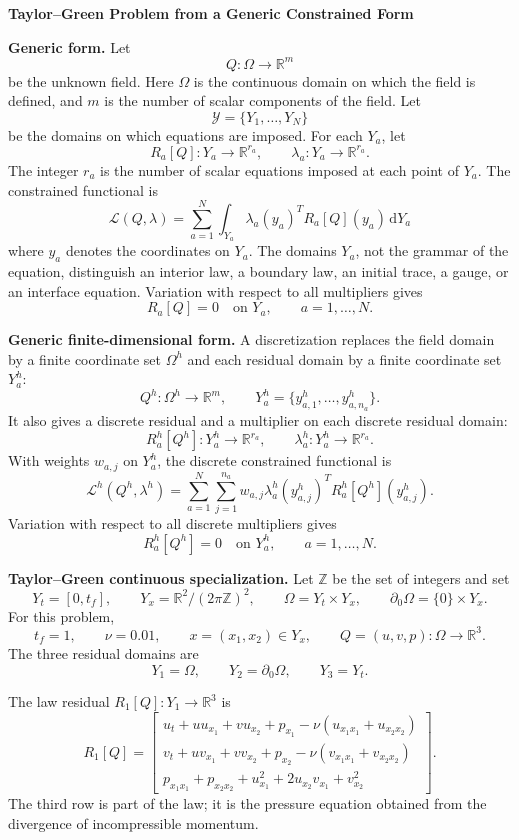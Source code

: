 \documentclass[10pt]{article}
\newcommand{\R}{\mathbb R}
\newcommand{\Z}{\mathbb Z}
\newcommand{\dd}{\,\mathrm d}
\begin{document}
\begin{center}
{\bfseries Taylor--Green Problem from a Generic Constrained Form}
\end{center}

\textbf{Generic form.}
Let
\[
  Q:\Omega\to\R^m
\]
be the unknown field.  Here \(\Omega\) is the continuous domain on which the
field is defined, and \(m\) is the number of scalar components of the field.
Let
\[
  \mathcal Y=\{Y_1,\ldots,Y_N\}
\]
be the domains on which equations are imposed.  For each \(Y_a\), let
\[
  R_a[Q]:Y_a\to\R^{r_a},
  \qquad
  \lambda_a:Y_a\to\R^{r_a}.
\]
The integer \(r_a\) is the number of scalar equations imposed at each point of
\(Y_a\).
The constrained functional is
\[
  \boxed{
  \mathcal L(Q,\lambda)
  =
  \sum_{a=1}^N
  \int_{Y_a}
  \lambda_a(y_a)^T R_a[Q](y_a)\dd Y_a
  }
\]
where \(y_a\) denotes the coordinates on \(Y_a\).  The domains \(Y_a\), not the
grammar of the equation, distinguish an interior law, a boundary law, an
initial trace, a gauge, or an interface equation.  Variation with respect to
all multipliers gives
\[
  R_a[Q]=0\quad\text{on }Y_a,\qquad a=1,\ldots,N.
\]

\textbf{Generic finite-dimensional form.}
A discretization replaces the field domain by a finite coordinate set
\(\Omega^h\) and each residual domain by a finite coordinate set \(Y_a^h\):
\[
  Q^h:\Omega^h\to\R^m,\qquad
  Y_a^h=\{y_{a,1}^h,\ldots,y_{a,n_a}^h\}.
\]
It also gives a discrete residual and a multiplier on each discrete residual
domain:
\[
  R_a^h[Q^h]:Y_a^h\to\R^{r_a},
  \qquad
  \lambda_a^h:Y_a^h\to\R^{r_a}.
\]
With weights \(w_{a,j}\) on \(Y_a^h\), the discrete constrained functional is
\[
  \boxed{
  \mathcal L^h(Q^h,\lambda^h)
  =
  \sum_{a=1}^N
  \sum_{j=1}^{n_a}
  w_{a,j}\lambda_a^h(y_{a,j}^h)^T
  R_a^h[Q^h](y_{a,j}^h)
  }.
\]
Variation with respect to all discrete multipliers gives
\[
  R_a^h[Q^h]=0\quad\text{on }Y_a^h,\qquad a=1,\ldots,N.
\]

\textbf{Taylor--Green continuous specialization.}
Let \(\Z\) be the set of integers and set
\[
  Y_t=[0,t_f],\qquad
  Y_x=\R^2/(2\pi\Z)^2,\qquad
  \Omega=Y_t\times Y_x,\qquad
  \partial_0\Omega=\{0\}\times Y_x .
\]
For this problem,
\[
  t_f=1,\qquad \nu=0.01,\qquad
  x=(x_1,x_2)\in Y_x,\qquad
  Q=(u,v,p):\Omega\to\R^3 .
\]
The three residual domains are
\[
  Y_1=\Omega,\qquad
  Y_2=\partial_0\Omega,\qquad
  Y_3=Y_t .
\]

The law residual \(R_1[Q]:Y_1\to\R^3\) is
\[
R_1[Q]=
\begin{bmatrix}
u_t+u u_{x_1}+v u_{x_2}+p_{x_1}
  -\nu(u_{x_1x_1}+u_{x_2x_2})\\
v_t+u v_{x_1}+v v_{x_2}+p_{x_2}
  -\nu(v_{x_1x_1}+v_{x_2x_2})\\
p_{x_1x_1}+p_{x_2x_2}
  +u_{x_1}^2+2u_{x_2}v_{x_1}+v_{x_2}^2
\end{bmatrix}.
\]
The third row is part of the law; it is the pressure equation obtained from
the divergence of incompressible momentum.
\end{document}

